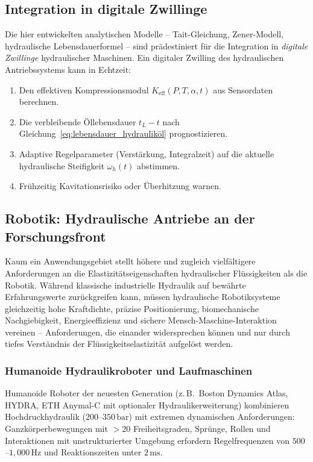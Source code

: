 ﻿\documentclass[a4paper,12pt]{scrreprt}
\theoremstyle{definition}
\begin{document}
\subsection{Integration in digitale Zwillinge}
\label{sec:ausblick_dz}

Die hier entwickelten analytischen Modelle -- Tait-Gleichung, Zener-Modell,
hydraulische Lebensdauerformel -- sind prädestiniert für die Integration
in \emph{digitale Zwillinge} hydraulischer Maschinen. Ein digitaler
Zwilling des hydraulischen Antriebssystems kann in Echtzeit:
\begin{enumerate}
  \item Den effektiven Kompressionsmodul $K_{\mathrm{eff}}(P, T, \alpha, t)$
    aus Sensordaten berechnen.
  \item Die verbleibende Öllebensdauer $t_L - t$ nach
    Gleichung~\eqref{eq:lebensdauer_hydrauliköl} prognostizieren.
  \item Adaptive Regelparameter (Verstärkung, Integralzeit) auf die
    aktuelle hydrau\-lische Steifigkeit $\omega_h(t)$ abstimmen.
  \item Frühzeitig Kavitationsrisiko oder Überhitzung warnen.
\end{enumerate}

\subsection{Robotik: Hydraulische Antriebe an der Forschungsfront}

Kaum ein Anwendungsgebiet stellt höhere und zugleich vielfältigere
Anforderungen an die Elastizitätseigenschaften hydraulischer Flüssig\-keiten
als die Robotik. Während klassische industrielle Hydraulik auf
bewährte Erfahrungswerte zurückgreifen kann, müssen hydraulische
Robotiksysteme gleichzeitig hohe Kraftdichte, präzise Positionierung,
biomechanische Nachgiebigkeit, Energieeffizienz und sichere
Mensch-Maschine-Interaktion vereinen -- Anforderungen, die einander
widersprechen können und nur durch tiefes Verständnis der
Flüssigkeitselastizität aufgelöst werden.

\subsubsection{Humanoide Hydraulikroboter und Laufmaschinen}

Humanoide Roboter der neuesten Generation (z.\,B.\ Boston Dynamics Atlas,
HYDRA, ETH Anymal-C mit optionaler Hydraulikerweiterung) kombinieren
Hochdruckhydraulik ($200$--$350\,\mathrm{bar}$) mit extremen dynamischen
Anforderungen: Ganzkörperbewegungen mit $>20$ Freiheitsgraden,
Sprünge, Rol\-len und Interaktionen mit unstrukturierter Umgebung
erfordern Regelfrequenzen von $500$--$1{,}000\,\mathrm{Hz}$ und
Reaktionszeiten unter $2\,\mathrm{ms}$.
\end{document}

